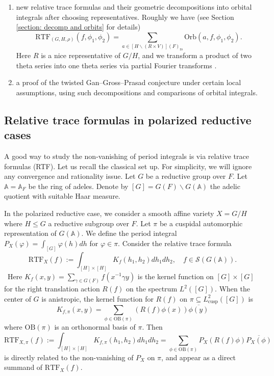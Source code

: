\documentclass[11pt, reqno]{amsart}
\numberwithin{equation}{subsection}
\theoremstyle{plain}
\theoremstyle{definition}
\newcommand{\BA}{\mathbb A}
\newcommand{\CS}{\mathcal{S}}
\begin{document}
\begin{enumerate}
    \item new relative trace formulas and their geometric decompositions into orbital integrals after choosing representatives. Roughly we have (see Section \ref{section: decomp and orbits} for details) 
\[
\mathrm{RTF}_{(G, H,\rho)}(f, \phi_1, \phi_2)=\sum_{a \in [H \backslash (R \times V)](F)_{\mathrm{rs}}} \mathrm{Orb}(a, f, \phi_1, \phi_2).
\]
Here $R$ is a nice representative of $G/H$, and we transform a product of two theta series into one theta series via partial Fourier transforms \cite{Li1992,Liu2014relative,Xue-GGP}.
    \item a proof of the twisted Gan--Gross--Prasad conjecture \cite{TwistedGGP} under certain local assumptions, using such decompositions and comparisons of orbital integrals. 
\end{enumerate}


\subsection{Relative trace formulas in polarized reductive cases}

A good way to study the non-vanishing of period integrals is via relative trace formulas (RTF). Let us recall the classical set up. For simplicity, we will ignore any convergence and rationality issue. Let $G$ be a reductive group over $F$. Let $\BA=\BA_F$ be the ring of adeles. Denote by $[G]=G(F) \backslash G(\BA)$ the adelic quotient with suitable Haar measure. 


In the polarized reductive case, we consider a smooth affine variety $X=G/H$ where $H \leq G$ a reductive subgroup over $F$. Let $\pi$ be a cuspidal automorphic representation of $G(\mathbb A)$. We define the period integral $P_X(\varphi) = \int_{[G]} \varphi(h) dh$ for $\varphi \in \pi$. Consider the relative trace formula
\[
\mathrm{RTF}_{X}(f):= \int_{[H] \times [H]} K_f(h_1, h_2)  dh _1 dh_2, \quad f \in \CS(G(\BA)).
\]\
Here $K_f(x, y)=\sum_{\gamma \in G(F)} f(x^{-1}\gamma y)$ is the kernel function on $[G] \times [G]$ for the right translation action $R(f)$ on the spectrum $L^2([G])$. When the center of $G$ is anistropic, the kernel function for $R(f)$ on $\pi \subseteq L^2_{\mathrm{cusp}}([G])$ is 
\[
K_{f,\pi}(x,y)= \sum_{\phi \in \mathrm{OB}(\pi)} (R(f)\phi(x)) \overline{\phi(y)}
\]
where $\mathrm{OB}(\pi)$ is an orthonormal basis of $\pi$. Then
\[
\mathrm{RTF}_{X,\pi}(f):= \int_{[H] \times [H]} K_{f,\pi}(h_1, h_2)  dh_1 dh_2 = \sum_{\phi \in \mathrm{OB}(\pi)} P_X(R(f)\phi) \overline{P_X(\phi)}
\]
is directly related to the non-vanishing of $P_X$ on $\pi$, and appear as a direct summand of $\mathrm{RTF}_{X}(f)$. 
\end{document}
